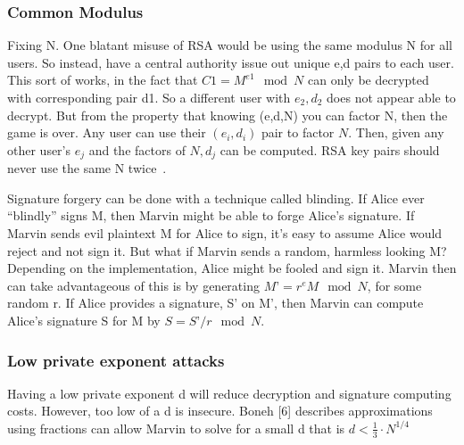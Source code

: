 \documentclass[12pt,journal,compsoc]{IEEEtran}
\begin{document}
\subsubsection{\qquad Common Modulus}
\label{sec:qquad-common-modulus}
Fixing N.  One blatant misuse of RSA would be using the same modulus N
for all users.  So instead, have a central authority issue out unique
e,d pairs to each user.  This sort of works, in the fact that $C1 =
M^{e1} \mod N$ can only be decrypted with corresponding pair d1. So a
different user with $e_{2},d_{2}$ does not appear able to decrypt. But from the
property that knowing (e,d,N) you can factor N, then the game is over.
Any user can use their $(e_{i}, d_{i})$ pair to factor $N$. Then,
given any other user’s $e_{j}$ and the factors of $N, d_{j}$ can be
computed. RSA key pairs should never use the same N
twice~\cite{boneh1999twenty}.
\par
Signature forgery can be done with a technique called blinding.  If
Alice ever “blindly” signs M, then Marvin might be able to forge
Alice’s signature.  If Marvin sends evil plaintext M for Alice to
sign, it’s easy to assume Alice would reject and not sign it.  But
what if Marvin sends a random, harmless looking M?  Depending on the
implementation, Alice might be fooled and sign it.  Marvin then can
take advantageous of this is by generating $M’ = r^{e} M \mod N$, for
some random r.  If Alice provides a signature, S’ on M’, then Marvin
can compute Alice’s signature S for M by $S = S’/r \mod N$.

\subsubsection{\qquad Low private exponent attacks}
\label{sec:qquad-low-private}

Having a low private exponent d will reduce decryption and signature
computing costs.  However, too low of a d is insecure.  Boneh [6]
describes approximations using fractions can allow Marvin to solve for
a small d that is $d < \frac{1}{3}\cdot N^{1/4}$
\end{document}
